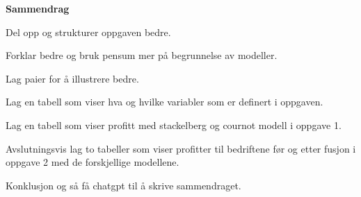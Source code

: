 \documentclass[
  12pt,
  a4paper,
  DIV=11,
  numbers=noendperiod]{scrartcl}
\begin{document}






\thispagestyle{plain}
\begin{center}
    \Large
    \textbf{Sammendrag}
\end{center}

Del opp og strukturer oppgaven bedre.

Forklar bedre og bruk pensum mer på begrunnelse av modeller. 

Lag paier for å illustrere bedre.

Lag en tabell som viser hva og hvilke variabler som er definert i oppgaven.

Lag en tabell som viser profitt med stackelberg og cournot modell i oppgave 1.

Avslutningsvis lag to tabeller som viser profitter til bedriftene før og etter fusjon i oppgave 2 med de forskjellige modellene.

Konklusjon og så få chatgpt til å skrive sammendraget.
\end{document}
